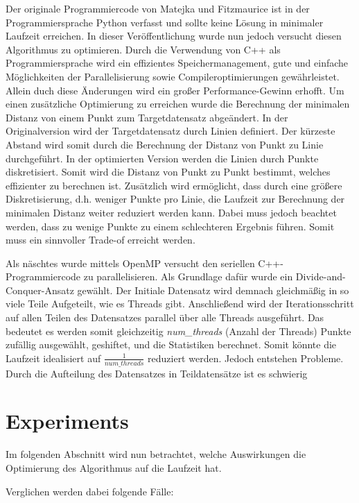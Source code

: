 \documentclass[sigconf]{acmart}
\begin{document}
Der originale Programmiercode von Matejka und Fitzmaurice ist in der Programmiersprache Python verfasst und sollte keine Lösung in minimaler Laufzeit erreichen. In dieser Veröffentlichung wurde nun jedoch versucht diesen Algorithmus zu optimieren. Durch die Verwendung von C++ als Programmiersprache wird ein effizientes Speichermanagement, gute und einfache Möglichkeiten der Parallelisierung sowie Compileroptimierungen gewährleistet. Allein duch diese Änderungen wird ein großer Performance-Gewinn erhofft. 
Um einen zusätzliche Optimierung zu erreichen wurde die Berechnung der minimalen Distanz von einem Punkt zum Targetdatensatz abgeändert. In der Originalversion wird der Targetdatensatz durch Linien definiert. Der kürzeste Abstand wird somit durch die Berechnung der Distanz von Punkt zu Linie durchgeführt. In der optimierten Version werden die Linien durch Punkte diskretisiert. Somit wird die Distanz von Punkt zu Punkt bestimmt, welches effizienter zu berechnen ist. Zusätzlich wird ermöglicht, dass durch eine größere Diskretisierung, d.h. weniger Punkte pro Linie, die Laufzeit zur Berechnung der minimalen Distanz weiter reduziert werden kann. Dabei muss jedoch beachtet werden, dass zu wenige Punkte zu einem schlechteren Ergebnis führen. Somit muss ein sinnvoller Trade-of erreicht werden.

Als näschtes wurde mittels OpenMP versucht den seriellen C++-Programmiercode zu parallelisieren. Als Grundlage dafür wurde ein Divide-and-Conquer-Ansatz gewählt. Der Initiale Datensatz wird demnach gleichmäßig in so viele Teile Aufgeteilt, wie es Threads gibt. Anschließend wird der Iterationsschritt auf allen Teilen des Datensatzes parallel über alle Threads ausgeführt. Das bedeutet es werden somit gleichzeitig \textit{num\_threads} (Anzahl der Threads) Punkte zufällig ausgewählt, geshiftet, und die Statistiken berechnet. Somit könnte die Laufzeit idealisiert auf $\frac{1}{num\_threads}$ reduziert werden.
Jedoch entstehen Probleme. Durch die Aufteilung des Datensatzes in Teildatensätze ist es schwierig 



\section{Experiments}\label{sec:exp}

Im folgenden Abschnitt wird nun betrachtet, welche Auswirkungen die Optimierung des Algorithmus auf die Laufzeit hat. 

Verglichen werden dabei folgende Fälle:
\end{document}
